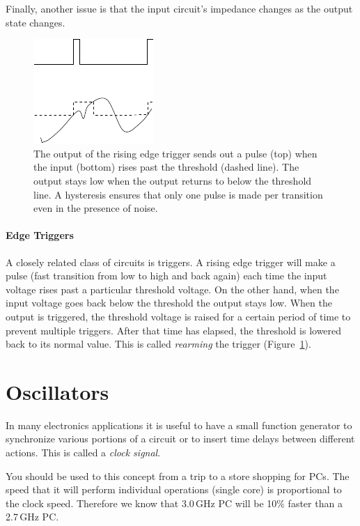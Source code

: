 \documentclass{article}
\begin{document}
Finally, another issue is that the input circuit's impedance changes as the output state changes.
 

\begin{figure}
\begin{center}
\includegraphics{pics/edge_trigger}
\end{center}
\caption{The output of the rising edge trigger sends out a pulse (top) when the input (bottom) rises past the threshold (dashed line). The output stays low when the output returns to below the threshold line. A hysteresis ensures that only one pulse is made per transition even in the presence of noise.}
\label{fig:edge_trigger}
\end{figure}

\paragraph{Edge Triggers}
A closely related class of circuits is triggers. A rising edge trigger will make a pulse (fast transition from low to high and back again) each time the input voltage rises past a particular threshold voltage. On the other hand, when the input voltage goes back below the threshold the output stays low. When the output is triggered, the threshold voltage is raised for a certain period of time to prevent multiple triggers.  After that time has elapsed, the threshold is lowered back to its normal value. This is called \emph{rearming} the trigger (Figure~\ref{fig:edge_trigger}). 

\section{Oscillators}
In many electronics applications it is useful to have a small function generator to synchronize various portions of a circuit or to insert time delays between different actions. This is called a \emph{clock signal}.

You should be used to this concept from a trip to a store shopping for PCs. The speed that it will perform individual operations (single core) is proportional to the clock speed. Therefore we know that 3.0\,GHz PC will be 10\% faster than a 2.7\,GHz PC. 
\end{document}
